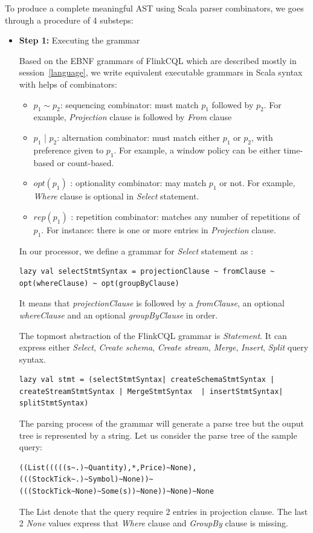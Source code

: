 To produce a complete meaningful AST using Scala parser combinators, we goes through a procedure of 4 substeps:
\begin{itemize}

\item \textbf{Step 1:} Executing the grammar

Based on the EBNF grammars of FlinkCQL which are described mostly in session~\ref{language}, we write equivalent executable grammars in Scala syntax with helps of combinators:
\begin{itemize}
	\item $p_1 \sim p_2$: sequencing combinator: must match $p_1$ followed by $p_2$. For example, \textit{Projection} clause is followed by \textit{From} clause
	\item $p_1$ | $p_2$: alternation combinator: must match either $p_1$ or $p_2$, with preference given to $p_1$. For example, a window policy can be either time-based or count-based.
	\item $opt(p_1)$ : optionality combinator: may match $p_1$ or not. For example, \textit{Where} clause is optional in \textit{Select} statement.
	\item $rep(p_1)$ : repetition combinator: matches any number of repetitions of $p_1$. For instance: there is one or more entries in \textit{Projection} clause.
\end{itemize} 

In our processor, we define a grammar for \textit{Select} statement as :
\begin{lstlisting}
lazy val selectStmtSyntax = projectionClause ~ fromClause ~ opt(whereClause) ~ opt(groupByClause)
\end{lstlisting}
It means that \textit{projectionClause} is followed by a \textit{fromClause}, an optional \textit{whereClause} and an optional \textit{groupByClause} in order.

The topmost abstraction of the FlinkCQL grammar is \textit{Statement}. It can express either \textit{Select}, \textit{Create schema}, \textit{Create stream}, \textit{Merge}, \textit{Insert}, \textit{Split} query syntax.
\begin{lstlisting}
lazy val stmt = (selectStmtSyntax| createSchemaStmtSyntax | createStreamStmtSyntax | MergeStmtSyntax  | insertStmtSyntax| splitStmtSyntax)
\end{lstlisting}

The parsing process of the grammar will generate a parse tree but the ouput tree is represented by a string. Let us consider the parse tree of the sample query:
\begin{lstlisting}
((List(((((s~.)~Quantity),*,Price)~None),(((StockTick~.)~Symbol)~None))~(((StockTick~None)~Some(s))~None))~None)~None
\end{lstlisting}
The List denote that the query require 2 entries in projection clause. The last 2 \textit{None} values express that \textit{Where} clause and \textit{GroupBy} clause is missing.


\end{itemize}
